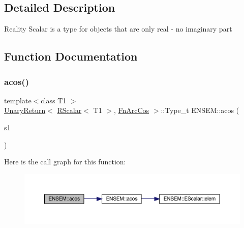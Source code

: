 \subsection{Detailed Description}
Reality Scalar is a type for objects that are only real -\/ no imaginary part 

\subsection{Function Documentation}
\mbox{\label{group__rscalar_gad83b7c66ca2adeacdccb66ae00e407c9}} 
\subsubsection{\texorpdfstring{acos()}{acos()}}
{\footnotesize\ttfamily template$<$class T1 $>$ \\
\mbox{\hyperlink{structENSEM_1_1UnaryReturn}{Unary\+Return}}$<$ \mbox{\hyperlink{classENSEM_1_1RScalar}{R\+Scalar}}$<$ T1 $>$, \mbox{\hyperlink{structENSEM_1_1FnArcCos}{Fn\+Arc\+Cos}} $>$\+::Type\+\_\+t E\+N\+S\+E\+M\+::acos (\begin{DoxyParamCaption}\item[{const \mbox{\hyperlink{classENSEM_1_1RScalar}{R\+Scalar}}$<$ T1 $>$ \&}]{s1 }\end{DoxyParamCaption})\hspace{0.3cm}{\ttfamily [inline]}}

Here is the call graph for this function\+:\nopagebreak
\begin{figure}[H]
\begin{center}
\leavevmode
\includegraphics[width=350pt]{d9/ded/group__rscalar_gad83b7c66ca2adeacdccb66ae00e407c9_cgraph}
\end{center}
\end{figure}
\mbox{\label{group__rscalar_ga7c3fdb23cffd473f858244b3284a9620}} 
